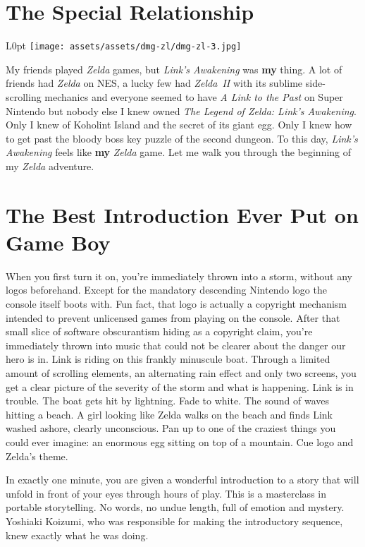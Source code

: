 \documentclass{book}
\begin{document}
\FloatBarrier\needspace{10mm}\section*{The Special Relationship}\nopagebreak[4]

\begin{wrapfigure}{L}{0pt} \texttt{[image: assets/assets/dmg-zl/dmg-zl-3.jpg]}\end{wrapfigure}
My friends played \emph{Zelda} games, but \emph{Link’s Awakening} was \textbf{my} thing. A lot of friends had \emph{Zelda} on NES, a lucky few had \emph{Zelda~II} with its sublime side-scrolling mechanics and everyone seemed to have \emph{A Link to the Past} on Super Nintendo but nobody else I knew owned \emph{The Legend of Zelda: Link’s Awakening}. Only I knew of Koholint Island and the secret of its giant egg. Only I knew how to get past the bloody boss key puzzle of the second dungeon. To this day, \emph{Link’s Awakening} feels like \textbf{my} \emph{Zelda} game. Let me walk you through the beginning of my \emph{Zelda} adventure.

\FloatBarrier\needspace{10mm}\section*{The Best Introduction Ever Put on Game Boy}\nopagebreak[4]

When you first turn it on, you’re immediately thrown into a storm, without any logos beforehand. Except for the mandatory descending Nintendo logo the console itself boots with. Fun fact, that logo is actually a copyright mechanism intended to prevent unlicensed games from playing on the console. After that small slice of software obscurantism hiding as a copyright claim, you’re immediately thrown into music that could not be clearer about the danger our hero is in. Link is riding on this frankly minuscule boat. Through a limited amount of scrolling elements, an alternating rain effect and only two screens, you get a clear picture of the severity of the storm and what is happening. Link is in trouble. The boat gets hit by lightning. Fade to white. The sound of waves hitting a beach. A girl looking like Zelda walks on the beach and finds Link washed ashore, clearly unconscious. Pan up to one of the craziest things you could ever imagine: an enormous egg sitting on top of a mountain. Cue logo and Zelda’s theme.



In exactly one minute, you are given a wonderful introduction to a story that will unfold in front of your eyes through hours of play. This is a masterclass in portable storytelling. No words, no undue length, full of emotion and mystery. Yoshiaki Koizumi, who was responsible for making the introductory sequence, knew exactly what he was doing.
\end{document}
